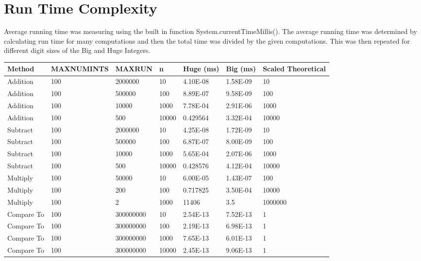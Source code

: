 \documentclass[12pt, letterpaper, titlepage, hidelinks]{article}
\begin{document}
\section{Run Time Complexity}
Average running time was measuring using the built in function System.currentTimeMillis(). The average running time was determined by calculating run time for many computations and then the total time was divided by the given computations. This was then repeated for different digit sizes of the Big and Huge Integers.\\
\begin{table}[H]
	\centering
	\begin{tabular}{lllllll}
		\toprule
		Method     & MAXNUMINTS & MAXRUN    & n     & Huge (ms)     & Big  (ms)     & Scaled Theoretical\\ \midrule
		Addition   & 100        & 2000000   & 10    & 4.10E-08 & 1.58E-09 & 10\\
		Addition   & 100        & 500000    & 100   & 8.89E-07 & 9.58E-09 & 100\\
		Addition   & 100        & 10000     & 1000  & 7.78E-04 & 2.91E-06 & 1000\\
		Addition   & 100        & 500       & 10000 & 0.429564 & 3.32E-04 & 10000\\ \midrule
		Subtract   & 100        & 2000000   & 10    & 4.25E-08 & 1.72E-09 & 10\\
		Subtract   & 100        & 500000    & 100   & 6.87E-07 & 8.00E-09 & 100\\
		Subtract   & 100        & 10000     & 1000  & 5.65E-04 & 2.07E-06 & 1000\\
		Subtract   & 100        & 500       & 10000 & 0.428576 & 4.12E-04 & 10000\\ \midrule
		Multiply   & 100        & 50000     & 10    & 6.00E-05 & 1.43E-07 & 100\\
		Multiply   & 100        & 200       & 100   & 0.717825 & 3.50E-04 & 10000\\
		Multiply   & 100        & 2         & 1000  & 11406    & 3.5      & 1000000\\ \midrule
		Compare To & 100        & 300000000 & 10    & 2.54E-13 & 7.52E-13 & 1\\
		Compare To & 100        & 300000000 & 100   & 2.19E-13 & 6.98E-13 & 1\\
		Compare To & 100        & 300000000 & 1000  & 7.65E-13 & 6.01E-13 & 1\\
		Compare To & 100        & 300000000 & 10000 & 2.45E-13 & 9.06E-13 & 1\\ \bottomrule
	\end{tabular}
\end{table}
\end{document}
